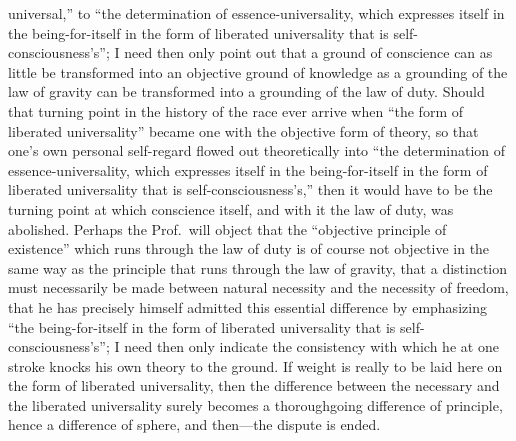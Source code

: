 \documentclass[12pt]{book}
\newcommand{\opage}[1]{\marginnote{\footnotesize\textit{[#1]}}}
\begin{document}
universal,'' to ``the determination of essence-universality, which
expresses itself in the being-for-itself in the form of liberated
universality that is self-consciousness's''; I need then only point out
that a ground of conscience can as little be transformed into an
objective ground of knowledge as a grounding of the law of gravity can be
transformed into a grounding of the law of duty. Should that turning point
in the history of the race ever arrive when ``the form of liberated
universality'' became one with the objective form of theory, so that one's
own personal self-regard flowed out theoretically into ``the determination
of essence-universality, which expresses itself in the being-for-itself in
the form of liberated universality that is self-consciousness's,'' then it
would have to be the turning point at which conscience itself, and with
it the law of duty, was abolished. Perhaps the Prof.\ will object that the
``objective principle of existence'' which runs through the law of duty is
of course not objective in the same way as the principle that runs through
the law of gravity, that a distinction must necessarily be made between
natural necessity and the necessity of freedom, that he has precisely
himself
\opage{31}\setcounter{footnote}{0}%
admitted this essential difference by emphasizing ``the being-for-itself
in the form of liberated universality that is self-consciousness's''; I
need then only indicate the consistency with which he at one stroke knocks
his own theory to the ground. If weight is really to be laid here on the
form of liberated universality, then the difference between the necessary
and the liberated universality surely becomes a thoroughgoing difference
of principle, hence a difference of sphere, and then---the dispute is
ended.
\end{document}
